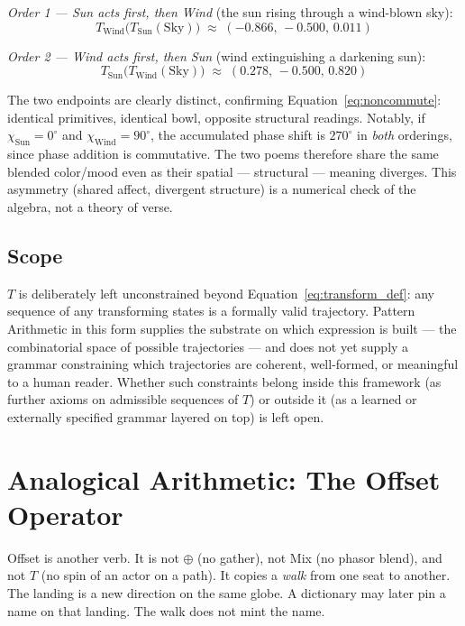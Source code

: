 \documentclass[12pt, a4paper]{article}
\begin{document}
\emph{Order 1 --- Sun acts first, then Wind} (the sun rising through a
wind-blown sky):
\begin{equation}
    T_{\text{Wind}}\big(T_{\text{Sun}}(\text{Sky})\big) \;\approx\; (-0.866,\, -0.500,\, 0.011)
\end{equation}

\emph{Order 2 --- Wind acts first, then Sun} (wind extinguishing a
darkening sun):
\begin{equation}
    T_{\text{Sun}}\big(T_{\text{Wind}}(\text{Sky})\big) \;\approx\; (0.278,\, -0.500,\, 0.820)
\end{equation}

The two endpoints are clearly distinct, confirming
Equation~\eqref{eq:noncommute}: identical primitives, identical
bowl, opposite structural readings. Notably, if $\chi_{\text{Sun}}
= 0^\circ$ and $\chi_{\text{Wind}} = 90^\circ$, the accumulated phase
shift is $270^\circ$ in \emph{both} orderings, since phase addition is
commutative. The two poems therefore share the same blended color/mood
even as their spatial --- structural --- meaning diverges. This
asymmetry (shared affect, divergent structure) is a numerical check of
the algebra, not a theory of verse.

\subsection{Scope}
\label{subsec:transform_scope}
$T$ is deliberately left unconstrained beyond
Equation~\eqref{eq:transform_def}: any sequence of any transforming
states is a formally valid trajectory. Pattern Arithmetic in this form
supplies the substrate on which expression is built --- the
combinatorial space of possible trajectories --- and does not yet
supply a grammar constraining which trajectories are coherent,
well-formed, or meaningful to a human reader. Whether such constraints
belong inside this framework (as further axioms on admissible
sequences of $T$) or outside it (as a learned or externally specified
grammar layered on top) is left open.

\section{Analogical Arithmetic: The Offset Operator}
\label{sec:analogical_offset}

Offset is another verb. It is not $\oplus$ (no gather), not Mix
(no phasor blend), and not $T$
(no spin of an actor on a path). It copies a \emph{walk} from one
seat to another. The landing is a new direction on the same globe.
A dictionary may later pin a name on that landing. The walk does
not mint the name.
\end{document}
